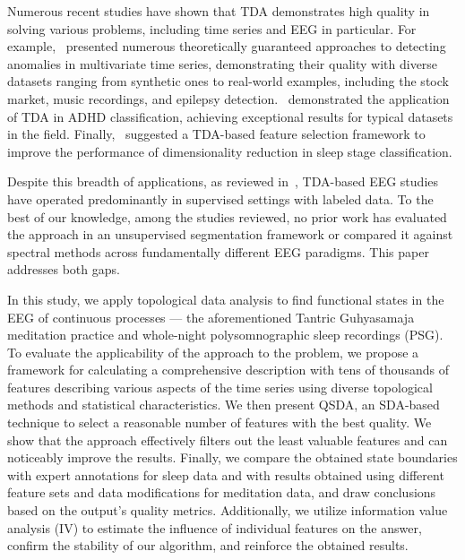 \documentclass[pdflatex,sn-basic,Numbered]{sn-jnl}
\begin{document}
Numerous recent studies have shown that TDA demonstrates high quality in solving various problems, including time series and EEG in particular. For example,~\cite{chazal2024topologicalanalysisdetectinganomalies,rai2024identifyingextremeeventsstock,heo2024persistenthomologyfeaturedtime,chrétien2024timetopologicalanalysiseeg} presented numerous theoretically guaranteed approaches to detecting anomalies in multivariate time series, demonstrating their quality with diverse datasets ranging from synthetic ones to real-world examples, including the stock market, music recordings, and epilepsy detection.~\cite{cai2024topologicalfeaturesearchmethod} demonstrated the application of TDA in ADHD classification, achieving exceptional results for typical datasets in the field. Finally,~\cite{deng2024twostagehierarchicalexplainablefeature} suggested a TDA-based feature selection framework to improve the performance of dimensionality reduction in sleep stage classification.

Despite this breadth of applications, as reviewed in~\cite{10.3389/fnins.2021.761703}, TDA-based EEG studies have operated predominantly in supervised settings with labeled data. To the best of our knowledge, among the studies reviewed, no prior work has evaluated the approach in an unsupervised segmentation framework or compared it against spectral methods across fundamentally different EEG paradigms. This paper addresses both gaps.

In this study, we apply topological data analysis to find functional states in the EEG of continuous processes --- the aforementioned Tantric Guhyasamaja meditation practice and whole-night polysomnographic sleep recordings (PSG). To evaluate the applicability of the approach to the problem, we propose a framework for calculating a comprehensive description with tens of thousands of features describing various aspects of the time series using diverse topological methods and statistical characteristics. We then present QSDA, an SDA-based technique to select a reasonable number of features with the best quality. We show that the approach effectively filters out the least valuable features and can noticeably improve the results. Finally, we compare the obtained state boundaries with expert annotations for sleep data and with results obtained using different feature sets and data modifications for meditation data, and draw conclusions based on the output's quality metrics. Additionally, we utilize information value analysis (IV) to estimate the influence of individual features on the answer, confirm the stability of our algorithm, and reinforce the obtained results.
\end{document}
